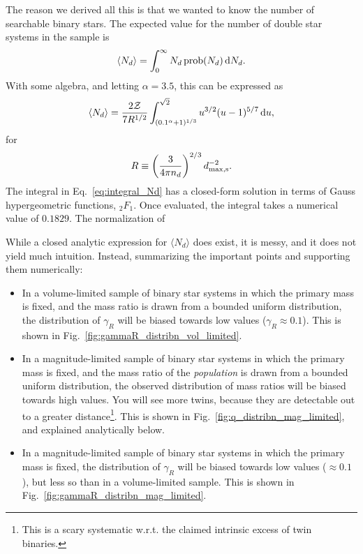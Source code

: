 \documentclass{emulateapj}
\begin{document}
The reason we derived all this is that we wanted to know the number of 
searchable binary stars.
The expected value for the number of double star systems in the sample is
\begin{equation}
\langle N_d \rangle = \int_{0}^{\infty} N_d\, {\rm prob}(N_d) \,{\rm d}N_d.
\end{equation}
With some algebra, and letting $\alpha=3.5$, this can be expressed as
\begin{equation}
\langle N_d \rangle = \frac{2 \mathcal{Z}}{7 R^{1/2}}
\int_{(0.1^\alpha + 1)^{1/3}}^{\sqrt{2}} u^{3/2} (u-1)^{5/7} \,{\rm d}u ,
\label{eq:integral_Nd}
\end{equation}
for
\begin{equation}
R \equiv \left(\frac{3}{4\pi n_d}\right)^{2/3} d_{\rm max,s}^{-2}.
\end{equation}
The integral in Eq.~\ref{eq:integral_Nd} has a closed-form solution in terms 
of Gauss hypergeometric functions, $_2F_1$. Once evaluated, the integral takes 
a numerical value of $0.1829$.
The normalization of 

 

While a closed analytic expression for $\langle N_d \rangle$ does exist, it is 
messy, and it does not yield much intuition. Instead, summarizing the important 
points and supporting them numerically:
\begin{itemize}
	\item In a volume-limited sample of binary star systems in which the 
	primary mass is fixed, and the mass ratio is drawn from a bounded uniform 
	distribution, the distribution of $\gamma_R$ will be biased towards low 
	values ($\gamma_R \approx 0.1$). This is shown in 
	Fig.~\ref{fig:gammaR_distribn_vol_limited}.
	\item In a magnitude-limited sample of binary star systems in which the 
	primary mass is fixed, and the mass ratio of the \textit{population} is 
	drawn from a bounded uniform distribution, the observed distribution of 
	mass ratios will be biased towards high values. You will see more twins,
	because they are detectable out to a greater distance\footnote{This is a 
	scary systematic w.r.t. the claimed intrinsic excess of twin binaries.}. 
	This is shown in Fig.~\ref{fig:q_distribn_mag_limited}, and explained 
	analytically below.
	\item In a magnitude-limited sample of binary star systems in which the 
	primary mass is fixed, the distribution of $\gamma_R$ will be biased 
	towards low values ($\approx 0.1$), but less so than in a 
	volume-limited sample. This is shown in 
	Fig.~\ref{fig:gammaR_distribn_mag_limited}.
\end{itemize}
\end{document}
